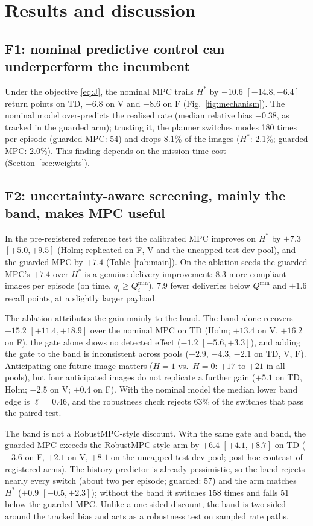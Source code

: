 \documentclass[final,3p,times,twocolumn]{elsarticle}
\begin{document}
\section{Results and discussion}\label{sec:results}
\subsection{F1: nominal predictive control can underperform the incumbent}
Under the objective \eqref{eq:J}, the nominal MPC trails $H^*$ by $-10.6$ $[-14.8,-6.4]$ return points on TD, $-6.8$
on V and $-8.6$ on F (Fig.~\ref{fig:mechanism}). The nominal model over-predicts the realised rate (median relative
bias $-0.38$, as tracked in the guarded arm); trusting it, the planner switches modes 180 times per episode (guarded
MPC: 54) and drops 8.1\% of the images ($H^*$: 2.1\%; guarded MPC: 2.0\%). This finding depends on the mission-time
cost (Section~\ref{sec:weights}).

\subsection{F2: uncertainty-aware screening, mainly the band, makes MPC useful}
In the pre-registered reference test the calibrated MPC improves on $H^*$ by $+7.3$ $[+5.0,+9.5]$ (Holm; replicated
on F, V and the uncapped test-dev pool), and the guarded MPC by $+7.4$ (Table~\ref{tab:main}). On the ablation seeds
the guarded MPC's $+7.4$ over $H^*$ is a genuine delivery improvement: 8.3 more compliant images per episode (on time,
$q_i\ge Q_i^{\min}$), 7.9 fewer deliveries below $Q^{\min}$ and $+1.6$ recall points, at a slightly larger payload.

The ablation attributes the gain mainly to the band. The band alone recovers $+15.2$ $[+11.4,+18.9]$ over the nominal
MPC on TD (Holm; $+13.4$ on V, $+16.2$ on F), the gate alone shows no detected effect ($-1.2$ $[-5.6,+3.3]$), and
adding the gate to the band is inconsistent across pools ($+2.9$, $-4.3$, $-2.1$ on TD, V, F). Anticipating one future
image matters ($H{=}1$ vs.\ $H{=}0$: $+17$ to $+21$ in all pools), but four anticipated images do not replicate a
further gain ($+5.1$ on TD, Holm; $-2.5$ on V; $+0.4$ on F). With the nominal model the median lower band edge is
$\ell{=}0.46$, and the robustness check rejects 63\% of the switches that pass the paired test.

The band is not a RobustMPC-style discount. With the same gate and band, the guarded MPC exceeds the RobustMPC-style
arm by $+6.4$ $[+4.1,+8.7]$ on TD ($+3.6$ on F, $+2.1$ on V, $+8.1$ on the uncapped test-dev pool; post-hoc contrast
of registered arms). The history predictor is already pessimistic, so the band rejects nearly every switch (about two
per episode; guarded: 57) and the arm matches $H^*$ ($+0.9$ $[-0.5,+2.3]$); without the band it switches 158 times and
falls 51 below the guarded MPC. Unlike a one-sided discount, the band is two-sided around the tracked bias and acts as
a robustness test on sampled rate paths.
\end{document}
